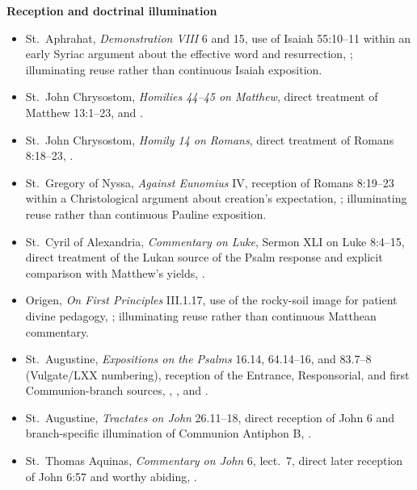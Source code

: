 \textbf{Reception and doctrinal illumination}
{\footnotesize
\begin{itemize}[itemsep=0em,topsep=0.15em,parsep=0pt]
\item St.~Aphrahat, \emph{Demonstration VIII} 6 and 15, use of Isaiah 55:10--11 within an early Syriac argument about the effective word and resurrection, ; illuminating reuse rather than continuous Isaiah exposition.
\item St.~John Chrysostom, \emph{Homilies 44--45 on Matthew}, direct treatment of Matthew 13:1--23,  and .
\item St.~John Chrysostom, \emph{Homily 14 on Romans}, direct treatment of Romans 8:18--23, .
\item St.~Gregory of Nyssa, \emph{Against Eunomius} IV, reception of Romans 8:19--23 within a Christological argument about creation's expectation, ; illuminating reuse rather than continuous Pauline exposition.
\item St.~Cyril of Alexandria, \emph{Commentary on Luke}, Sermon XLI on Luke 8:4--15, direct treatment of the Lukan source of the Psalm response and explicit comparison with Matthew's yields, .
\item Origen, \emph{On First Principles} III.1.17, use of the rocky-soil image for patient divine pedagogy, ; illuminating reuse rather than continuous Matthean commentary.
\item St.~Augustine, \emph{Expositions on the Psalms} 16.14, 64.14--16, and 83.7--8 (Vulgate/LXX numbering), reception of the Entrance, Responsorial, and first Communion-branch sources, , , and .
\item St.~Augustine, \emph{Tractates on John} 26.11--18, direct reception of John 6 and branch-specific illumination of Communion Antiphon B, .
\item St.~Thomas Aquinas, \emph{Commentary on John} 6, lect.~7, direct later reception of John 6:57 and worthy abiding, .
\end{itemize}}
